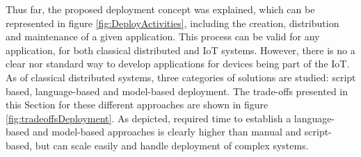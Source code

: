 Thus far, the proposed deployment concept was explained, which can be represented in figure \ref{fig:DeployActivities}, including the creation, distribution and maintenance of a given application.
This process can be valid for any application, for both classical distributed and IoT systems.
However, there is no a clear nor standard way to develop applications for devices being part of the IoT.
As of classical distributed systems, three categories of solutions are studied\cite{talwar2005approaches}: script based, language-based and model-based deployment.
The trade-offs presented in this Section for these different approaches are shown in figure \ref{fig:tradeoffsDeployment}.
As depicted, required time to establish a language-based and model-based approaches is clearly higher than manual and script-based, but can scale easily and handle deployment of complex systems.
